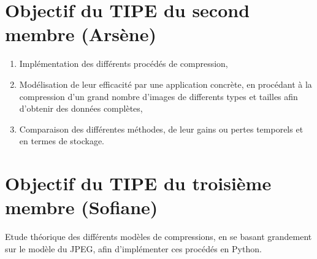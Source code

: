 \documentclass[a4paper, 11pt]{article}
\begin{document}
\section*{Objectif du TIPE du second membre (Ars\`ene)}
\begin{enumerate}
  \item Implémentation des différents procédés de compression,
  \item Modélisation de leur efficacité par une application concrète, en procédant à la compression d'un grand nombre d'images de differents types et tailles afin d'obtenir des données complètes,
  \item Comparaison des différentes méthodes, de leur gains ou pertes temporels et en termes de stockage.
\end{enumerate}

\section*{Objectif du TIPE du troisi\`eme membre (Sofiane)}
Etude théorique des différents modèles de compressions, en se basant grandement sur le modèle du JPEG, afin d'implémenter ces procédés en Python. 

\printbibliography[title=Références bibliographiques]
\end{document}
